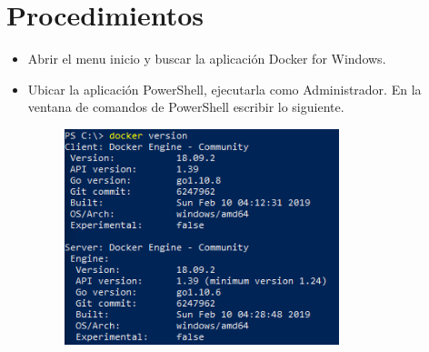 \section{Procedimientos} 

\begin{itemize}
\subsection{Parte 1: Iniciando Docker}
	\item Abrir el menu inicio y buscar la aplicación Docker for Windows.

	\item Ubicar la aplicación PowerShell, ejecutarla como Administrador. En la ventana de comandos de PowerShell escribir
lo siguiente.
		\begin{figure}[H]
		\begin{center}
		\includegraphics[width=8cm]{./Imagenes/1}
		\end{center}
		\end{figure}
     

\end{itemize}
